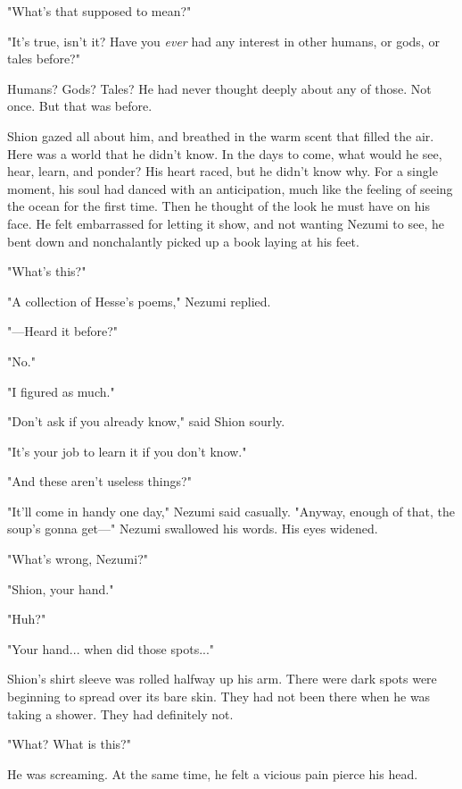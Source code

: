 "What's that supposed to mean?"

"It's true, isn't it? Have you \emph{ever} had any interest in other humans, or
gods, or tales before?"

Humans? Gods? Tales? He had never thought deeply about any of those. Not
once. But that was before.

Shion gazed all about him, and breathed in the warm scent that filled
the air. Here was a world that he didn't know. In the days to come, what
would he see, hear, learn, and ponder? His heart raced, but he didn't
know why. For a single moment, his soul had danced with an anticipation,
much like the feeling of seeing the ocean for the first time. Then he
thought of the look he must have on his face. He felt embarrassed for
letting it show, and not wanting Nezumi to see, he bent down and
nonchalantly picked up a book laying at his feet.

"What's this?"

"A collection of Hesse's poems," Nezumi replied.


"---Heard it before?"

"No."

"I figured as much."

"Don't ask if you already know," said Shion sourly.

"It's your job to learn it if you don't know."

"And these aren't useless things?"

"It'll come in handy one day," Nezumi said casually. "Anyway, enough of
that, the soup's gonna get---" Nezumi swallowed his words. His eyes
widened.

"What's wrong, Nezumi?"

"Shion, your hand."

"Huh?"

"Your hand... when did those spots..."

Shion's shirt sleeve was rolled halfway up his arm. There were dark
spots were beginning to spread over its bare skin. They had not been
there when he was taking a shower. They had definitely not.

"What? What is this?"

He was screaming. At the same time, he felt a vicious pain pierce his
head.

